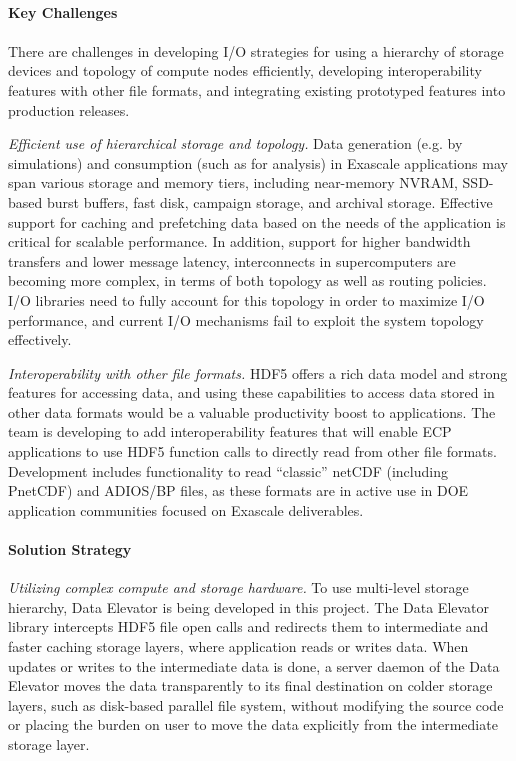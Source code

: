\paragraph{Key  Challenges}
\paragraph{}
There are challenges in developing I/O strategies for using a hierarchy of storage devices and topology of compute nodes efficiently, developing interoperability features with other file formats, and integrating existing prototyped features into production releases. 

\textit{Efficient use of hierarchical storage and topology.} Data generation (e.g. by simulations) and consumption (such as for analysis) in Exascale applications may span various storage and memory tiers, including near-memory NVRAM, SSD-based burst buffers, fast disk, campaign storage, and archival storage. Effective support for caching and prefetching data based on the needs of the application is critical for scalable performance. In addition, support for higher bandwidth transfers and lower message latency, interconnects in supercomputers are becoming more complex, in terms of both topology as well as routing policies. I/O libraries need to fully account for this topology in order to
maximize I/O performance, and current I/O mechanisms fail to exploit the system topology effectively.

\textit{Interoperability with other file formats.} HDF5 offers a rich data model and strong features for accessing data, and using these capabilities to access data stored in other data formats would be a valuable productivity boost to applications. The team is developing to add interoperability features that will enable ECP applications to use HDF5 function calls to directly read from other file formats. Development includes functionality to read “classic” netCDF (including PnetCDF) and ADIOS/BP files, as these formats are in active use in DOE application communities focused on Exascale deliverables. 

\paragraph{Solution Strategy}


\textit{Utilizing complex compute and storage hardware. } To use multi-level storage hierarchy, Data Elevator is being developed in this project. The Data Elevator library intercepts HDF5 file open calls and redirects them to intermediate and faster caching storage layers, where application reads or writes data. When updates or writes to the intermediate data is done, a server daemon of the Data Elevator moves the data transparently to its final destination on colder storage layers, such as disk-based parallel file system, without modifying the source code or placing the burden on user to move the data explicitly from the intermediate storage layer.

